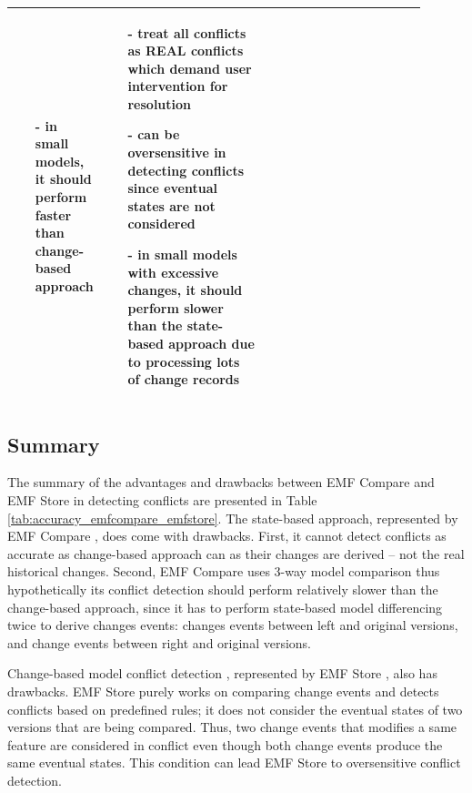 \begin{table}[]
\begin{tabular}{|p{0.1\linewidth}|p{0.4\linewidth}|p{0.4\linewidth}|}
\begin{minipage}[t]{\linewidth}
\begin{itemize}[leftmargin=9pt]
        \item[-] in small models, it should perform faster than change-based approach
        \item[]
      \end{itemize}
    \end{minipage}
    &
    \begin{minipage}[t]{\linewidth}
      \raggedright
      \begin{itemize}[leftmargin=9pt]
        \setlength\itemsep{2pt}
        \item[-] treat all conflicts as \textsf{REAL} conflicts which demand user intervention for resolution
        \item[-] can be oversensitive in detecting conflicts since eventual states are not considered
        \item[-] in small models with excessive changes, it should perform slower than the state-based approach due to processing lots of change records
        \item[]
      \end{itemize} 
    \end{minipage}
    \\
    \hline                         
  \end{tabular}
\end{table}

\subsection{Summary}
\label{sec:summary}
The summary of the advantages and drawbacks between EMF Compare and EMF Store in detecting conflicts are presented in Table \ref{tab:accuracy_emfcompare_emfstore}. The state-based approach, represented by EMF Compare \cite{emfcompare2018developer}, does come with drawbacks. First, it cannot detect conflicts as accurate as change-based approach can as their changes are derived -- not the real historical changes. Second, EMF Compare uses 3-way model comparison \cite{emfcompare2018developer} thus hypothetically its conflict detection should perform relatively slower than the change-based approach, since it has to perform state-based model differencing twice to derive changes events: changes events between left and original versions, and change events between right and original versions. 

Change-based model conflict detection \cite{koegel2010operation}, represented by EMF Store \cite{emfstore2019what}, also has drawbacks. EMF Store purely works on comparing change events and detects conflicts based on predefined rules; it does not consider the eventual states of two versions that are being compared. Thus, two change events that modifies a same feature are considered in conflict even though both change events produce the same eventual states. This condition can lead EMF Store to oversensitive conflict detection. 

